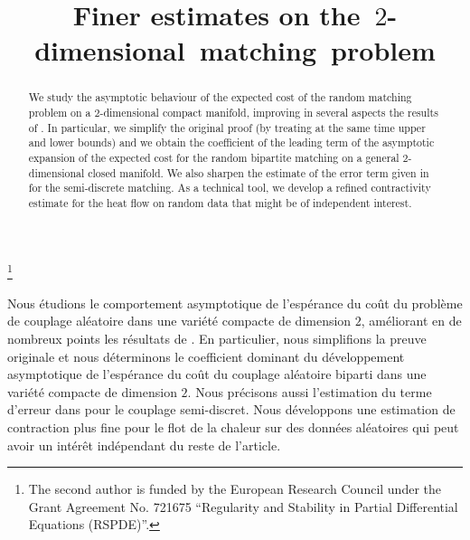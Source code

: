 \documentclass[JEP,XML,SOM,Unicode]{cedram}
\newcounter{results}[section]
\theoremstyle{plain}
\theoremstyle{definition}
\numberwithin{equation}{section}
\begin{document}
\title[Finer estimates on the $2$-d matching problem]
{Finer estimates on the~$2$-dimensional~matching~problem}

\author[\initial{L.} \lastname{Ambrosio}]{ }
\address{Scuola Normale Superiore\\
Piazza dei Cavalieri 7, 56126 Pisa, Italy}

\author[\initial{F.} \lastname{Glaudo}]{ }
\address{ETH Zürich\\
Rämistrasse 101, 8092 Zürich, Switzerland}

\thanks{The second author is funded by the European Research Council under the Grant Agreement No. 721675 “Regularity and Stability in Partial Differential Equations (RSPDE)”.}

\begin{abstract}
We study the asymptotic behaviour of the expected cost of the random matching problem on a $2$-dimensional compact manifold, improving in several aspects the results of \cite{Ambrosio-Stra-Trevisan2018}. In particular, we simplify the original proof (by treating at the same time upper and lower bounds) and we obtain the coefficient of the leading term of the asymptotic expansion of the expected cost for the random bipartite matching on a general $2$-dimensional closed manifold. We also sharpen the estimate of the error term given in \cite{Ledoux18} for the semi-discrete matching. As a technical tool, we develop a refined contractivity estimate for the heat flow on random data that might be of independent interest.
\end{abstract}





\begin{altabstract}
Nous étudions le comportement asymptotique de l'espérance du coût du problème de couplage aléatoire dans une variété compacte de dimension $2$, améliorant en de nombreux points les résultats de \cite{Ambrosio-Stra-Trevisan2018}. En particulier, nous simplifions la preuve originale et nous déterminons le coefficient dominant du développement asymptotique de l'espérance du coût du couplage aléatoire biparti dans une variété compacte de dimension $2$. Nous précisons aussi l'estimation du terme d'erreur dans \cite{Ledoux18} pour le couplage semi-discret. Nous développons une estimation de contraction plus fine pour le flot de la chaleur sur des données aléatoires qui peut avoir un intérêt indépendant du reste de l'article.
\end{altabstract}
\end{document}
